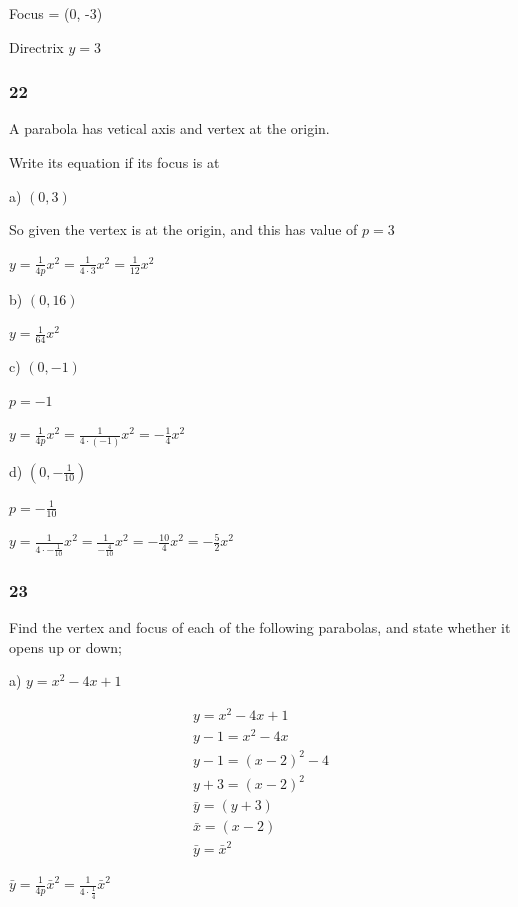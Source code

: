 \documentclass[]{report}
\begin{document}
Focus = (0, -3)

Directrix $y = 3$

\subsubsection{22}

A parabola has vetical axis and vertex at the origin.

Write its equation if its focus is at 

a) $(0, 3)$

So given the vertex is at the origin, and this has value of $p = 3$

$ y = \frac{1}{4p}x^2 = \frac{1}{4\cdot3}x^2 = \frac{1}{12}x^2$

b) $(0, 16)$

$y = \frac{1}{64}x^2$

c) $(0, -1)$

$ p = -1$

$ y = \frac{1}{4p}x^2 = \frac{1}{4\cdot (-1)} x^2 = -\frac{1}{4}x^2$

d) $(0, -\frac{1}{10})$

$p = -\frac{1}{10}$

$y = \frac{1}{4 \cdot -\frac{1}{10}}x^2 = \frac{1}{-\frac{4}{10}}x^2 = -\frac{10}{4}x^2 = -\frac{5}{2}x^2$


\subsubsection{23}

Find the vertex and focus of each of the following parabolas, and state whether it opens up or down;

a) $y = x^2 - 4x + 1$

\begin{align*}
y = x^2 -4x + 1 \tag{1} \\
y - 1 = x^2 -4x \tag{taking 1 off both sides} \\
y -1 = (x-2)^2 - 4 \tag{completing the square} \\
y + 3 = (x-2)^2 \\
\bar{y} = (y+3)  \tag{Assigning the left hand side to a new y coordinate system}\\
\bar{x} = (x-2) \tag{Similarly for the right hand side to a new x coordinate system}\\
\bar{y} = \bar{x}^2
\end{align*}

$\bar{y} = \frac{1}{4p}\bar{x}^2 = \frac{1}{4 \cdot \frac{1}{4}}\bar{x}^2$
\end{document}
